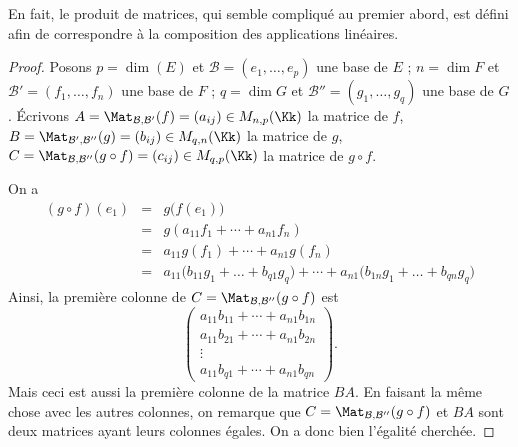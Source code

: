 \documentclass[class=report,crop=false]{standalone}
\begin{document}
En fait, le produit de matrices, qui semble compliqué au premier abord,
est défini afin de correspondre à la composition des applications linéaires.


\begin{proof}
Posons $p = \dim(E)$ et $\mathcal{B} = (e_1,\ldots, e_p)$ une base de $E$ ;
$n = \dim F$ et  $\mathcal{B}' = (f_1,\ldots, f_n)$ une base de $F$ ;
$q = \dim G$ et  $\mathcal{B}'' = (g_1,\ldots, g_q)$ une base de $G$.
\'Ecrivons
$A = \Mat_{\mathcal{B},\mathcal{B}'} (f) = (a_{ij}) \in M_{n,p}(\Kk)$ la matrice de $f$,
$B = \Mat_{\mathcal{B}',\mathcal{B}''} (g) = (b_{ij}) \in M_{q,n}(\Kk)$ la matrice de $g$,
$C = \Mat_{\mathcal{B},\mathcal{B}''} (g \circ f) = (c_{ij})\in M_{q,p}(\Kk)$ la matrice de $g\circ f$.

On a
$$\begin{array}{rcl}
(g \circ f)(e_1)
 & = & g\big(f(e_1)\big) \\
 & = & g(a_{11} f_1 +\cdots+ a_{n1} f_n) \\
 & = & a_{11} g(f_1) +\cdots+ a_{n1} g(f_n) \\
 & = & a_{11} \bigg( b_{11} g_1 +\dots+ b_{q1} g_q \bigg) +\cdots
       + a_{n1} \bigg( b_{1n} g_1 +\dots+ b_{qn} g_q \bigg)
\end{array}$$
Ainsi, la première colonne de $C = \Mat_{\mathcal{B},\mathcal{B}''} (g \circ f)$ est
$$\left(\begin{array}{c}
a_{11} b_{11} +\cdots+ a_{n1} b_{1n}\\
a_{11} b_{21} +\cdots+ a_{n1} b_{2n}\\
\vdots\\
a_{11} b_{q1} +\cdots+ a_{n1} b_{qn}
\end{array}
\right).$$
Mais ceci est aussi la première colonne de la matrice $BA$.
En faisant la même chose avec les autres colonnes, on remarque que $C = \Mat_{\mathcal{B},\mathcal{B}''} (g \circ f)$
et $BA$ sont deux matrices ayant leurs colonnes égales. On a donc bien l'égalité cherchée.
\end{proof}
\end{document}
